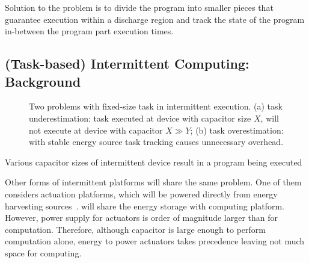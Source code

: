 Solution to the problem is to divide the program into smaller pieces that guarantee execution within a discharge region and track the state of the program in-between the program part execution times. 

\subsection{(Task-based) Intermittent Computing: Background}

\begin{figure}
	\centering
	\caption{Two problems with fixed-size task in intermittent execution. (a) task underestimation: task executed at device with capacitor size $X$, will not execute at device with capacitor $X\gg Y$; (b) task overestimation: with stable energy source task tracking causes unnecessary overhead.}
	\label{fig:fixed_task_problem}
\end{figure}

Various capacitor sizes of intermittent device result in a program being executed 



Other forms of intermittent platforms will share the same problem. One of them considers actuation platforms, which will be powered directly from energy harvesting sources~\cite{}. will share the energy storage with computing platform. However, power supply for actuators is order of magnitude larger than for computation. Therefore, although capacitor is large enough to perform computation alone, energy to power actuators takes precedence leaving not much space for computing.


